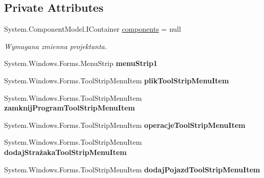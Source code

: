 \subsection*{Private Attributes}
\begin{DoxyCompactItemize}
\item 
System.\+Component\+Model.\+I\+Container \mbox{\hyperlink{class_statystyki___o_s_p_1_1_menu_glowne_a0f6fdc5f30828a9b3b5faca3598f0464}{components}} = null
\begin{DoxyCompactList}\small\item\em Wymagana zmienna projektanta. \end{DoxyCompactList}\item 
\mbox{\label{class_statystyki___o_s_p_1_1_menu_glowne_aad27b6e52ab9ecb14c177efd55e292e9}} 
System.\+Windows.\+Forms.\+Menu\+Strip {\bfseries menu\+Strip1}
\item 
\mbox{\label{class_statystyki___o_s_p_1_1_menu_glowne_a6eaf53248e03861aa56bf78d5997ae97}} 
System.\+Windows.\+Forms.\+Tool\+Strip\+Menu\+Item {\bfseries plik\+Tool\+Strip\+Menu\+Item}
\item 
\mbox{\label{class_statystyki___o_s_p_1_1_menu_glowne_af360506ab767462c010e8e7e99ddbd2b}} 
System.\+Windows.\+Forms.\+Tool\+Strip\+Menu\+Item {\bfseries zamknij\+Program\+Tool\+Strip\+Menu\+Item}
\item 
\mbox{\label{class_statystyki___o_s_p_1_1_menu_glowne_a94901a47d5c96629c0ba72096dae495d}} 
System.\+Windows.\+Forms.\+Tool\+Strip\+Menu\+Item {\bfseries operacje\+Tool\+Strip\+Menu\+Item}
\item 
\mbox{\label{class_statystyki___o_s_p_1_1_menu_glowne_aed5a0de286116e21febb0c141aa7bfd6}} 
System.\+Windows.\+Forms.\+Tool\+Strip\+Menu\+Item {\bfseries dodaj\+Strażaka\+Tool\+Strip\+Menu\+Item}
\item 
\mbox{\label{class_statystyki___o_s_p_1_1_menu_glowne_ab841e21325b71402cedbf3cfb9f05780}} 
System.\+Windows.\+Forms.\+Tool\+Strip\+Menu\+Item {\bfseries dodaj\+Pojazd\+Tool\+Strip\+Menu\+Item}
\item 

\end{DoxyCompactItemize}
